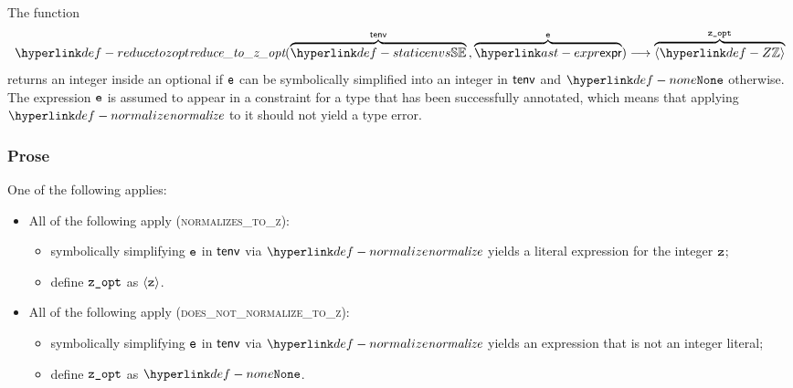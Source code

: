 \begin{mathpar}
\end{mathpar}

\begin{mathpar}
\end{mathpar}

\hypertarget{def-reducetozopt}{}
The function
\[
\reducetozopt(\overname{\staticenvs}{\tenv} \aslsep \overname{\expr}{\ve})
\aslto \overname{\langle\Z\rangle}{\vzopt}
\]
returns an integer inside an optional if $\ve$ can be symbolically simplified into an integer in $\tenv$
and $\None$ otherwise.
The expression $\ve$ is assumed to appear in a constraint for a type that has been successfully annotated,
which means that applying $\normalize$ to it should not yield a type error.

\subsubsection{Prose}
One of the following applies:
\begin{itemize}
  \item All of the following apply (\textsc{normalizes\_to\_z}):
  \begin{itemize}
    \item symbolically simplifying $\ve$ in $\tenv$ via $\normalize$ yields a literal expression for the integer $\vz$;
    \item define $\vzopt$ as $\langle\vz\rangle$.
  \end{itemize}

  \item All of the following apply (\textsc{does\_not\_normalize\_to\_z}):
  \begin{itemize}
    \item symbolically simplifying $\ve$ in $\tenv$ via $\normalize$ yields an expression that is not an integer literal;
    \item define $\vzopt$ as $\None$.
  \end{itemize}
\end{itemize}

